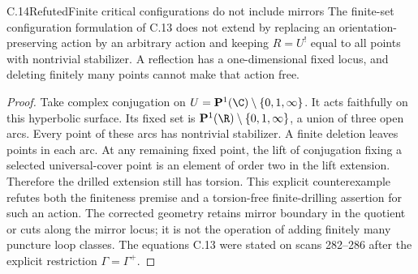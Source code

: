 \begin{claim}{C.14}{Refuted}{Finite critical configurations do not include mirrors}
The finite-set configuration formulation of C.13 does not extend by
replacing an orientation-preserving action by an arbitrary action and
keeping $R=U^!$ equal to all points with nontrivial stabilizer. A reflection
has a one-dimensional fixed locus, and deleting finitely many points
cannot make that action free.
\end{claim}
\begin{proof}
Take complex conjugation on
$U=\mathbf P^1(\C)\setminus\{0,1,\infty\}$. It acts faithfully on this
hyperbolic surface. Its fixed set is
$\mathbf P^1(\R)\setminus\{0,1,\infty\}$, a union of three open arcs.
Every point of these arcs has nontrivial stabilizer. A finite deletion
leaves points in each arc. At any remaining fixed point, the lift of
conjugation fixing a selected universal-cover point is an element of
order two in the lift extension. Therefore the drilled extension still
has torsion. This explicit counterexample refutes both the finiteness
premise and a torsion-free finite-drilling assertion for such an action.
The corrected geometry retains mirror boundary in the quotient or cuts
along the mirror locus; it is not the operation of adding finitely many
puncture loop classes. The equations C.13 were stated on scans 282--286
after the explicit restriction $\Gamma=\Gamma^+$.
\end{proof}

